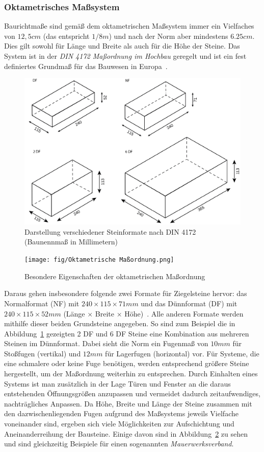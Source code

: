 \subsubsection*{Oktametrisches Maßsystem}
Baurichtmaße sind gemäß dem oktametrischen Maßsystem immer ein Vielfaches von \(12,5 cm\) (das entspricht \(1/8 m\)) und nach der Norm aber mindestens \(6.25cm\).
Dies gilt sowohl für Länge und Breite als auch für die Höhe der Steine.
Das System ist in der \textit{DIN 4172 Maßordnung im Hochbau} geregelt und ist ein fest definiertes Grundmaß für das Bauwesen in Europa~\cite{DIN417224}.
\begin{figure}[ht]
    \centering
    \includegraphics[width=0.8\columnwidth]{fig/Ziegelsteinformate DF NF 2DF 6DF.png}
    \caption{Darstellung verschiedener Steinformate nach DIN 4172 (Baunennmaß in Millimetern)~\cite{Steinfor38:online}}\label{fig:basics:Steinformate}
\end{figure}
\begin{figure}[hb]
  \centering
  \texttt{[image: fig/Oktametrische Maßordnung.png]}
  \caption{Besondere Eigenschaften der oktametrischen Maßordnung~\cite{Moro2021}}\label{fig:basics:OktametrischeMassordnung}
\end{figure}
Daraus gehen insbesondere folgende zwei Formate für Ziegelsteine hervor:
das Normalformat (NF) mit \(240\times115\times71 mm\) und das Dünnformat (DF) mit \(240\times115\times52 mm\) (Länge $\times$ Breite $\times$ Höhe)~\cite{Moro2021}.
Alle anderen Formate werden mithilfe dieser beiden Grundsteine angegeben.
So sind zum Beispiel die in Abbildung~\ref{fig:basics:Steinformate} gezeigten 2 DF und 6 DF Steine eine Kombination aus mehreren Steinen im Dünnformat.
Dabei sieht die Norm ein Fugenmaß von \(10 mm\) für Stoßfugen (vertikal) und \(12 mm\) für Lagerfugen (horizontal) vor.
Für Systeme, die eine schmalere oder keine Fuge benötigen, werden entsprechend größere Steine hergestellt, um der Maßordnung weiterhin zu entsprechen.
Durch Einhalten eines Systems ist man zusätzlich in der Lage Türen und Fenster an die daraus entstehenden Öffnungsgrößen anzupassen und vermeidet dadurch zeitaufwendiges, nachträgliches Anpassen.
Da Höhe, Breite und Länge der Steine zusammen mit den dazwischenliegenden Fugen aufgrund des Maßsystems jeweils Vielfache voneinander sind, ergeben sich viele Möglichkeiten zur Aufschichtung und Aneinanderreihung der Bausteine.
Einige davon sind in Abbildung~\ref{fig:basics:OktametrischeMassordnung} zu sehen und sind gleichzeitig Beispiele für einen sogenannten \textit{Mauerwerksverband}.

